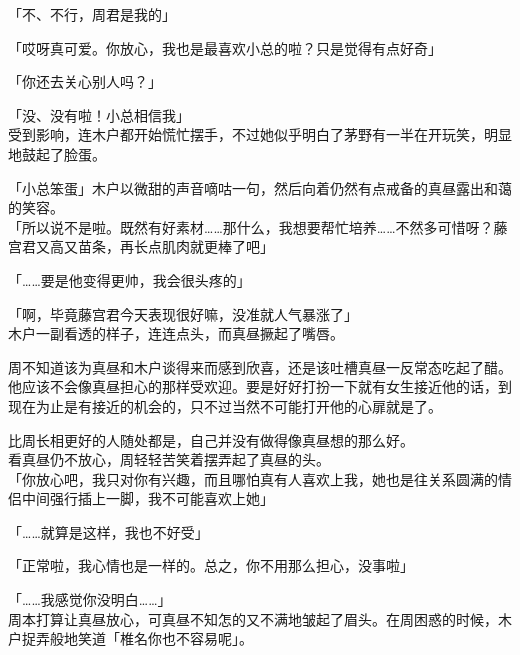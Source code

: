 「不、不行，周君是我的」

「哎呀真可爱。你放心，我也是最喜欢小总的啦？只是觉得有点好奇」

「你还去关心别人吗？」

「没、没有啦！小总相信我」\\

受到影响，连木户都开始慌忙摆手，不过她似乎明白了茅野有一半在开玩笑，明显地鼓起了脸蛋。

「小总笨蛋」木户以微甜的声音嘀咕一句，然后向着仍然有点戒备的真昼露出和蔼的笑容。\\

「所以说不是啦。既然有好素材……那什么，我想要帮忙培养……不然多可惜呀？藤宫君又高又苗条，再长点肌肉就更棒了吧」

「……要是他变得更帅，我会很头疼的」

「啊，毕竟藤宫君今天表现很好嘛，没准就人气暴涨了」\\

木户一副看透的样子，连连点头，而真昼撅起了嘴唇。

周不知道该为真昼和木户谈得来而感到欣喜，还是该吐槽真昼一反常态吃起了醋。\\

他应该不会像真昼担心的那样受欢迎。要是好好打扮一下就有女生接近他的话，到现在为止是有接近的机会的，只不过当然不可能打开他的心扉就是了。

比周长相更好的人随处都是，自己并没有做得像真昼想的那么好。\\

看真昼仍不放心，周轻轻苦笑着摆弄起了真昼的头。\\

「你放心吧，我只对你有兴趣，而且哪怕真有人喜欢上我，她也是往关系圆满的情侣中间强行插上一脚，我不可能喜欢上她」

「……就算是这样，我也不好受」

「正常啦，我心情也是一样的。总之，你不用那么担心，没事啦」

「……我感觉你没明白……」\\

周本打算让真昼放心，可真昼不知怎的又不满地皱起了眉头。在周困惑的时候，木户捉弄般地笑道「椎名你也不容易呢」。
